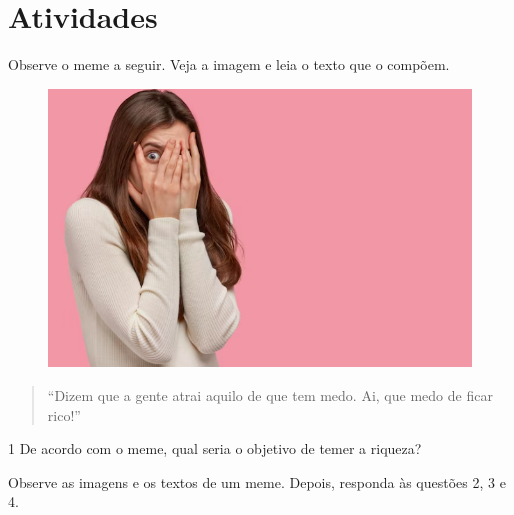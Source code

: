 \section{Atividades}

Observe o meme a seguir. Veja a imagem e leia o texto que o compõem.

\begin{figure}[htpb!]
\centering
\includegraphics[width=\textwidth]{./media/img2pt.png}
\end{figure}

\begin{quote}
``Dizem que a gente atrai aquilo de que tem medo. Ai, que medo de ficar rico!''
\end{quote}

\num{1} De acordo com o meme, qual seria o objetivo de temer a riqueza?



Observe as imagens e os textos de um meme. Depois, responda às questões 2, 3 e 4.

